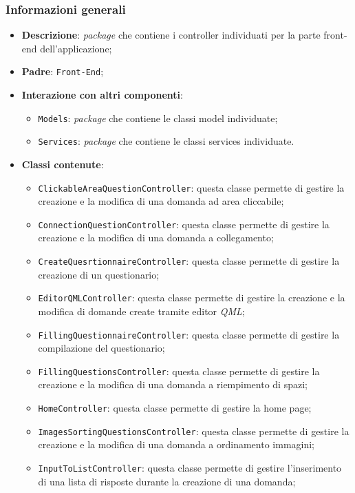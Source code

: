 \subsubsection{Informazioni generali}
\begin{itemize}
	\item \textbf{Descrizione}: \textit{package} che contiene i controller individuati per la parte front-end dell'applicazione;
	\item \textbf{Padre}: \texttt{Front-End};
	\item \textbf{Interazione con altri componenti}:
	\begin{itemize}
		\item \texttt{Models}: \textit{package} che contiene le classi model individuate;
		\item \texttt{Services}: \textit{package} che contiene le classi services individuate.
	\end{itemize}
	\item \textbf{Classi contenute}:
	\begin{itemize}
		\item \texttt{ClickableAreaQuestionController}: questa classe permette di gestire la creazione e la modifica di una domanda ad area cliccabile;
		\item \texttt{ConnectionQuestionController}: questa classe permette di gestire la creazione e la modifica di una domanda a collegamento;
		\item \texttt{CreateQuesrtionnaireController}: questa classe permette di gestire la creazione di un questionario;
		\item \texttt{EditorQMLController}: questa classe permette di gestire la creazione e la modifica di domande create tramite editor \textit{QML};
		\item \texttt{FillingQuestionnaireController}: questa classe permette di gestire la compilazione del questionario;
		\item \texttt{FillingQuestionsController}: questa classe permette di gestire la creazione e la modifica di una domanda	a riempimento di spazi;
		\item \texttt{HomeController}: questa classe permette di gestire la home page;
		\item \texttt{ImagesSortingQuestionsController}: questa classe permette di gestire la creazione e la modifica di una domanda a ordinamento immagini;
		\item \texttt{InputToListController}: questa classe permette di gestire l'inserimento di una lista di risposte durante la creazione di una domanda;

\end{itemize}
\end{itemize}
